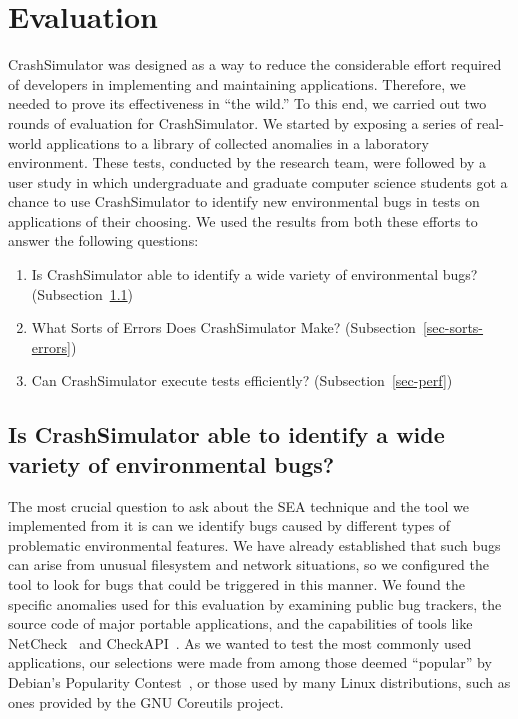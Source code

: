 \section{Evaluation}
\label{SEC:evaluation}

CrashSimulator was designed
as a way to reduce the considerable effort
required of developers
in implementing and maintaining applications.
Therefore,
we needed to prove its effectiveness in ``the wild.''
To this end,
we carried out two rounds of
evaluation for CrashSimulator.
We started by exposing
a series of real-world applications
to a library of collected anomalies in a laboratory environment.
These tests,
conducted by the research team,
were followed by a user study
in which undergraduate and graduate computer science students
got a chance to use CrashSimulator
to identify new environmental bugs
in tests on applications of their choosing.
We used the results from both these efforts
to answer the following questions:

\begin{enumerate}

\item{Is CrashSimulator able to identify a wide variety of environmental
    bugs?
(Subsection~\ref{sec-env-bugs})}

\item{What Sorts of Errors Does CrashSimulator Make?
    (Subsection~\ref{sec-sorts-errors})}

\item{Can CrashSimulator
      execute tests efficiently? (Subsection~\ref{sec-perf})}

\end{enumerate}

\subsection{Is CrashSimulator able to identify a wide variety of
environmental bugs?}
\label{sec-env-bugs}

The most crucial question to ask about the SEA technique and the tool we implemented from it is can we
identify bugs
caused by different types of problematic environmental features.
We have already established
that such bugs can arise from
unusual filesystem and network situations,
so we configured the tool to look
for bugs that could be triggered in this manner.
We found the specific anomalies used for this evaluation
by examining public bug trackers,
the source code of major portable applications, and the capabilities of
tools like NetCheck~\cite{Zhuang_NSDI_2014}
and CheckAPI~\cite{rasley2015detecting}.
As we wanted to test
the most commonly used applications,
our selections were made
from among those deemed ``popular''
by Debian's Popularity Contest~\cite{DebPopCon},
or those used
by many Linux distributions,
such as ones provided
by the GNU Coreutils project.


